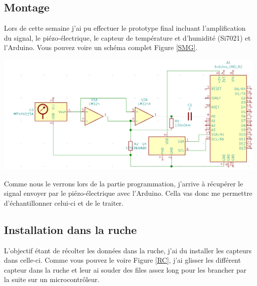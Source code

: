 \documentclass[11pt,french,a4paper]{article}
\begin{document}
\subsection{Montage}
Lors de cette semaine j'ai pu effectuer le prototype final incluant l'amplification du signal, le piézo-électrique, le capteur de température et d'humidité (Si7021) et l'Arduino. Vous pouvez voire un schéma complet Figure \ref{SMG}.
\\
\begin{center}
    \includegraphics[scale=0.5]{../img/SMG.png}
    \label{SMG}
\end{center}
Comme nous le verrons lors de la partie programmation, j'arrive à récupérer le signal envoyer par le piézo-électrique avec l'Arduino. Cella vas donc me permettre d'échantillonner celui-ci et de le traiter.
\subsection{Installation dans la ruche}
L'objectif étant de récolter les données dans la ruche, j'ai du installer les capteurs dans celle-ci. Comme vous pouvez le voire Figure \ref{RC}, j'ai glisser les différent capteur dans la ruche et leur ai souder des files assez long pour les brancher par la suite sur un microcontrôleur.
\end{document}
